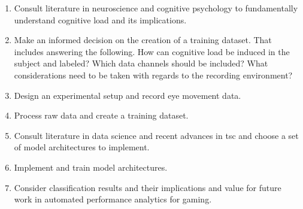 \begin{enumerate}
    \item Consult literature in neuroscience and cognitive psychology to fundamentally understand cognitive load and its implications.
    \item Make an informed decision on the creation of a training dataset. That includes answering the following. How can cognitive load be induced in the subject and labeled? Which data channels should be included? What considerations need to be taken with regards to the recording environment? 
    \item Design an experimental setup and record eye movement data.
    \item Process raw data and create a training dataset.
    \item Consult literature in data science and recent advances in \acrfull{tsc} and choose a set of model architectures to implement.
    \item Implement and train model architectures.
    \item Consider classification results and their implications and value for future work in automated performance analytics for gaming.
\end{enumerate}